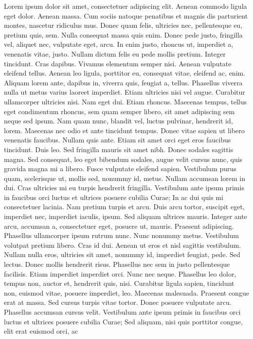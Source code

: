 \documentclass[a4paper,12 pt,twoside]{report}
\begin{document}
Lorem ipsum dolor sit amet, consectetuer adipiscing elit. Aenean
commodo ligula eget dolor. Aenean massa. Cum sociis natoque
penatibus et magnis dis parturient montes, nascetur ridiculus mus.
Donec quam felis, ultricies nec, pellentesque eu, pretium quis, sem.
Nulla consequat massa quis enim. Donec pede justo, fringilla vel,
aliquet nec, vulputate eget, arcu. In enim justo, rhoncus ut,
imperdiet a, venenatis vitae, justo. Nullam dictum felis eu pede
mollis pretium. Integer tincidunt. Cras dapibus. Vivamus elementum
semper nisi. Aenean vulputate eleifend tellus. Aenean leo ligula,
porttitor eu, consequat vitae, eleifend ac, enim. Aliquam lorem
ante, dapibus in, viverra quis, feugiat a, tellus. Phasellus viverra
nulla ut metus varius laoreet %
imperdiet. Etiam ultricies nisi vel augue. Curabitur ullamcorper
ultricies nisi. Nam eget dui. Etiam rhoncus. Maecenas tempus, tellus
eget condimentum rhoncus, sem quam semper libero, sit amet
adipiscing sem neque sed ipsum. Nam quam nunc, blandit vel, luctus
pulvinar, hendrerit id, lorem. Maecenas nec odio et ante tincidunt
tempus. Donec vitae sapien ut libero venenatis faucibus. Nullam quis
ante. Etiam sit amet orci eget eros faucibus tincidunt. Duis leo.
Sed fringilla mauris sit amet nibh. Donec sodales sagittis magna.
Sed consequat, leo eget bibendum sodales, augue velit cursus nunc,
quis gravida magna mi a libero. Fusce vulputate eleifend sapien.
Vestibulum purus quam, scelerisque ut, mollis sed, nonummy id,
metus. Nullam accumsan lorem in dui. Cras ultricies mi eu turpis
hendrerit fringilla. Vestibulum ante ipsum primis in faucibus orci
luctus et ultrices posuere cubilia Curae; In ac dui quis mi
consectetuer lacinia. Nam pretium turpis et arcu. Duis arcu tortor,
suscipit eget, imperdiet nec, imperdiet iaculis, ipsum. Sed aliquam
ultrices mauris. Integer ante arcu, accumsan a, consectetuer eget,
posuere ut, mauris. Praesent adipiscing. Phasellus ullamcorper ipsum
rutrum nunc. Nunc nonummy metus. Vestibulum volutpat pretium libero.
Cras id dui. Aenean ut eros et nisl sagittis vestibulum. Nullam
nulla eros, ultricies sit amet, nonummy id, imperdiet feugiat, pede.
Sed lectus. Donec mollis hendrerit risus. Phasellus nec sem in justo
pellentesque facilisis. Etiam imperdiet imperdiet orci. Nunc nec
neque. Phasellus leo dolor, tempus non, auctor et, hendrerit quis,
nisi. Curabitur ligula sapien, tincidunt non, euismod vitae, posuere
imperdiet, leo. Maecenas malesuada. Praesent congue erat at massa.
Sed cursus turpis vitae tortor. Donec posuere vulputate arcu.
Phasellus accumsan cursus velit. Vestibulum ante ipsum primis in
faucibus orci luctus et ultrices posuere cubilia Curae; Sed aliquam,
nisi quis porttitor congue, elit erat euismod orci, ac \cite{mitchell1997machine}
\end{document}
